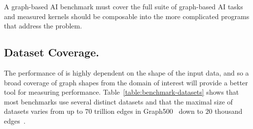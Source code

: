 A graph-based AI benchmark must cover the full suite of graph-based AI tasks and measured kernels should be composable into the more complicated programs that address the \gai problem. 



\subsection{Dataset Coverage.}
 The performance of \gai is highly dependent on the  shape of the input data, and so a broad coverage of graph shapes from the domain of interest  will provide a better tool for measuring performance. 
 Table~\ref{table:benchmark-datasets} shows that most benchmarks use several distinct datasets  and that  the maximal size of datasets varies from up to $70$ trillion edges in Graph500~\cite{Murphy2010} down to $20$ thousand edges~\cite{Huang2021}.

